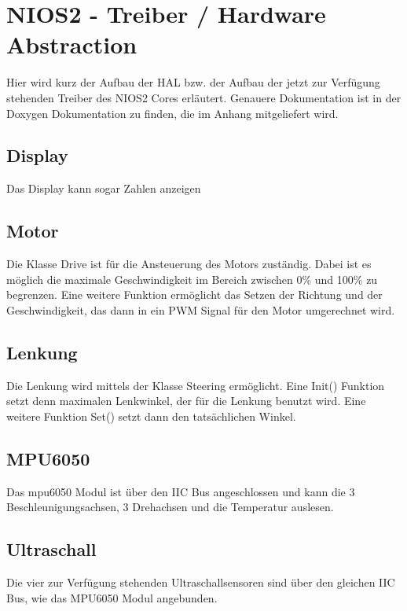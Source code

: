 \chapter{NIOS2 - Treiber / Hardware Abstraction}
Hier wird kurz der Aufbau der HAL bzw. der Aufbau der jetzt zur Verfügung stehenden Treiber des NIOS2 Cores erläutert. Genauere Dokumentation ist in der Doxygen Dokumentation zu finden, die im Anhang mitgeliefert wird. 
\section{Display}
Das Display kann sogar Zahlen anzeigen
\section{Motor}
Die Klasse Drive ist für die Ansteuerung des Motors zuständig. Dabei ist es möglich die maximale Geschwindigkeit im Bereich zwischen 0\% und 100\% zu begrenzen. Eine weitere Funktion ermöglicht das Setzen der Richtung und der Geschwindigkeit, das dann in ein PWM Signal für den Motor umgerechnet wird. 
\section{Lenkung}
Die Lenkung wird mittels der Klasse Steering ermöglicht. Eine Init() Funktion setzt denn maximalen Lenkwinkel, der für die Lenkung benutzt wird. Eine weitere Funktion Set() setzt dann den tatsächlichen Winkel.
\section{MPU6050}
Das mpu6050 Modul ist über den IIC Bus angeschlossen und kann die 3 Beschleunigungsachsen, 3 Drehachsen und die Temperatur auslesen.
\section{Ultraschall}
Die vier zur Verfügung stehenden Ultraschallsensoren sind über den gleichen IIC Bus, wie das MPU6050 Modul angebunden.  

